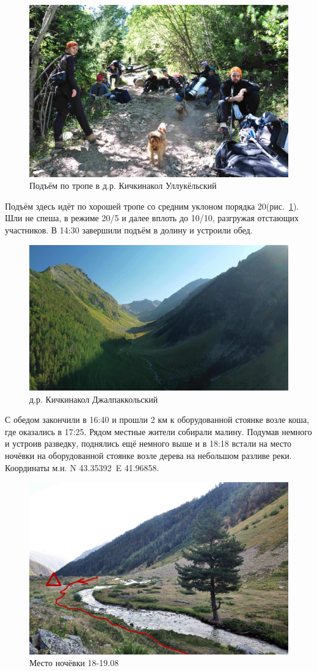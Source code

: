 \begin{figure}[h!]
	\centering
	\includegraphics[width=0.7\linewidth]{../pics/DSC_0436}
	\caption{Подъём по тропе в д.р. Кичкинакол Уллукёльский}
	\label{fig:DSC_0436}
\end{figure}

Подъём здесь идёт по хорошей тропе со средним уклоном порядка 20\degree (рис.~\ref{fig:DSC_0436}). Шли не спеша, в режиме 20/5 и далее вплоть до 10/10, разгружая отстающих участников. В 14:30 завершили подъём в долину и устроили обед.

\begin{figure}[h!]
	\centering
	\includegraphics[width=0.7\linewidth]{../pics/DJI_0805}
	\caption{д.р. Кичкинакол Джалпаккольский}
	\label{fig:kichkinakol}
\end{figure}

С обедом закончили в 16:40 и прошли 2 км к оборудованной стоянке возле коша, где оказались в 17:25. Рядом местные жители собирали малину. Подумав немного и устроив разведку, поднялись ещё немного выше и в 18:18 встали на место ночёвки на оборудованной стоянке возле дерева на небольшом разливе реки. Координаты м.н. N 43.35392\degree~E 41.96858\degree.
\begin{figure}[h!]
	\centering
	\includegraphics[width=0.7\linewidth]{../pics/camp_18}
	\caption{Место ночёвки 18-19.08}
	\label{fig:camp_18}
\end{figure}


\clearpage